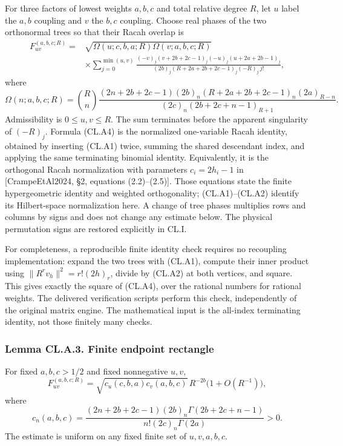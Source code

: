 \documentclass[a4paper,11pt]{article}
\numberwithin{equation}{section}
\begin{document}
For three factors of lowest weights \(a,b,c\) and total relative degree \(R\), let \(u\) label the \(a,b\) coupling and \(v\) the \(b,c\) coupling. Choose real phases of the two orthonormal trees so that their Racah overlap is \[
\begin{split}
F_{uv}^{(a,b,c;R)}
={}&\sqrt{\Omega(u;c,b,a;R)\Omega(v;a,b,c;R)}\\
&\times
\sum_{j=0}^{\min(u,v)}
\frac{(-v)_j(v+2b+2c-1)_j(-u)_j(u+2a+2b-1)_j}
{(2b)_j(R+2a+2b+2c-1)_j(-R)_j\,j!},
\end{split}
\tag{CL.A4}
\] where \[
\Omega(n;a,b,c;R)=
\binom Rn
\frac{(2n+2b+2c-1)(2b)_n
(R+2a+2b+2c-1)_n(2a)_{R-n}}
{(2c)_n(2b+2c+n-1)_{R+1}}.
\tag{CL.A5}
\] Admissibility is \(0\leq u,v\leq R\). The sum terminates before the apparent singularity of \((-R)_j\). Formula (CL.A4) is the normalized one-variable Racah identity, obtained by inserting (CL.A1) twice, summing the shared descendant index, and applying the same terminating binomial identity. Equivalently, it is the orthogonal Racah normalization with parameters \(c_i=2h_i-1\) in {[}CrampeEtAl2024, §2, equations (2.2)--(2.5){]}. Those equations state the finite hypergeometric identity and weighted orthogonality; (CL.A1)--(CL.A2) identify its Hilbert-space normalization here. A change of tree phases multiplies rows and columns by signs and does not change any estimate below. The physical permutation signs are restored explicitly in CL.I.

For completeness, a reproducible finite identity check requires no recoupling implementation: expand the two trees with (CL.A1), compute their inner product using \(\|R^rv_h\|^2=r!(2h)_r\), divide by (CL.A2) at both vertices, and square. This gives exactly the square of (CL.A4), over the rational numbers for rational weights. The delivered verification scripts perform this check, independently of the original matrix engine. The mathematical input is the all-index terminating identity, not those finitely many checks.

\hypertarget{lemma-cl.a.3.-finite-endpoint-rectangle}{%
\subsubsection{Lemma CL.A.3. Finite endpoint rectangle}\label{lemma-cl.a.3.-finite-endpoint-rectangle}}

For fixed \(a,b,c>1/2\) and fixed nonnegative \(u,v\), \[
F_{uv}^{(a,b,c;R)}
=\sqrt{c_u(c,b,a)c_v(a,b,c)}\,R^{-2b}
\bigl(1+O(R^{-1})\bigr),
\tag{CL.A6}
\] where \[
c_n(a,b,c)=
\frac{(2n+2b+2c-1)(2b)_n\Gamma(2b+2c+n-1)}
{n!(2c)_n\Gamma(2a)}>0.
\tag{CL.A7}
\] The estimate is uniform on any fixed finite set of \(u,v,a,b,c\).
\end{document}
